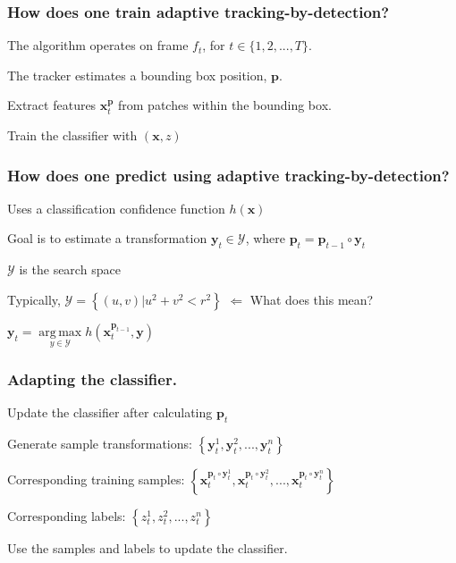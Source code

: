 \documentclass[mathserif,handout]{beamer}
\DeclareMathOperator*{\argmax}{arg\,max}
\begin{document}
\begin{frame}
    \frametitle{How does one train adaptive tracking-by-detection?}
    The algorithm operates on frame $f_t$, for $t \in \{1, 2, ..., T\}$.

    The tracker estimates a bounding box position, $\mathbf{p}$.

    Extract features $\mathbf{x}_t^\mathbf{p}$ from patches within the bounding box.

    Train the classifier with $(\mathbf{x}, z)$

\end{frame}

\begin{frame}
    \frametitle{How does one predict using adaptive tracking-by-detection?}
    Uses a classification confidence function $h(\mathbf{x})$

    Goal is to estimate a transformation $\mathbf{y}_t \in \mathcal{Y}$, where $\mathbf{p}_t =
    \mathbf{p}_{t-1} \circ \mathbf{y}_t$

    $\mathcal{Y}$ is the search space

    Typically, $\mathcal{Y} = \left\{ (u,v) | u^2 + v^2 < r^2 \right \}$ \alert{$\Leftarrow$ What does
    this mean?}

    $\mathbf{y}_t = \argmax\limits_{y \in \mathcal{Y}} h \left( \mathbf{x}_t^{\mathbf{p}_{t-1}},
    \mathbf{y} \right)$
\end{frame}

\begin{frame}
    \frametitle{Adapting the classifier.}
    Update the classifier after calculating $\mathbf{p}_t$

    Generate sample transformations: $\left\{ \mathbf{y}_t^1, \mathbf{y}_t^2, ..., \mathbf{y}_t^n
    \right\}$

    Corresponding training samples: $\left\{ \mathbf{x}_t^{\mathbf{p}_t \circ \mathbf{y}_t^1},
    \mathbf{x}_t^{\mathbf{p}_t \circ \mathbf{y}_t^2}, ..., \mathbf{x}_t^{\mathbf{p}_t \circ
    \mathbf{y}_t^n} \right\}$

    Corresponding labels: $\left\{ z_t^1, z_t^2, ..., z_t^n \right\}$

    Use the samples and labels to update the classifier.
\end{frame}

\end{document}
